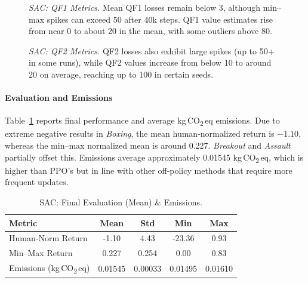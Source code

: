 \begin{figure}
	\centering
	\caption{\emph{SAC: QF1 Metrics.} Mean QF1 losses remain below 3, although min–max spikes can exceed 50 after 40k steps. QF1 value estimates rise from near 0 to about 20 in the mean, with some outliers above 80.}
	\label{fig:sac_q_metrics_1}
\end{figure}

\begin{figure}
	\centering
	\quad
	\caption{\emph{SAC: QF2 Metrics.} QF2 losses also exhibit large spikes (up to 50+ in some runs), while QF2 values increase from below 10 to around 20 on average, reaching up to 100 in certain seeds.}
	\label{fig:sac_q_metrics_2}
\end{figure}

\paragraph{Evaluation and Emissions}
Table~\ref{tab:sac_eval} reports final performance and average kg\,CO\textsubscript{2}\,eq emissions. Due to extreme negative results in \emph{Boxing}, the mean human‐normalized return is \(-1.10\), whereas the min–max normalized mean is around 0.227. \emph{Breakout} and \emph{Assault} partially offset this. Emissions average approximately 0.01545 kg\,CO\textsubscript{2}\,eq, which is higher than PPO's but in line with other off-policy methods that require more frequent updates.

\begin{table}
	\centering
	\caption{SAC: Final Evaluation (Mean) \& Emissions.}
	\label{tab:sac_eval}
	\begin{tabular}{lcccc}
		\toprule
		\textbf{Metric} & \textbf{Mean} & \textbf{Std} & \textbf{Min} & \textbf{Max} \\
		\midrule
		Human‐Norm Return & -1.10 & 4.43 & -23.36 & 0.93 \\
		Min–Max Return   & 0.227 & 0.254 & 0.00   & 0.83 \\
		Emissions (kg\,CO\textsubscript{2}\,eq) & 0.01545 & 0.00033 & 0.01495 & 0.01610 \\
		\bottomrule
	\end{tabular}
\end{table}


